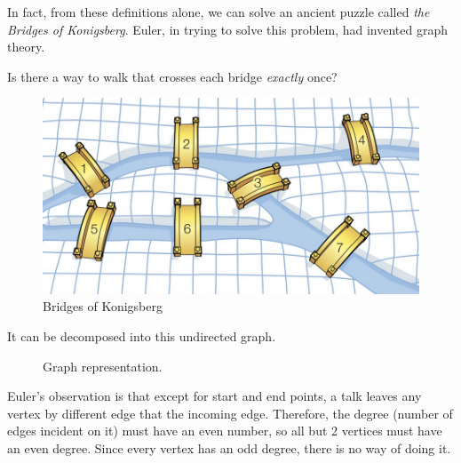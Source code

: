 \documentclass{article}
\begin{document}
    In fact, from these definitions alone, we can solve an ancient puzzle called \textit{the Bridges of Konigsberg}. Euler, in trying to solve this problem, had invented graph theory. 

    \begin{example}
      Is there a way to walk that crosses each bridge \textit{exactly} once? 
      \begin{figure}[H]
        \centering 
        \includegraphics[scale=0.4]{img/bridges.png}
        \caption{Bridges of Konigsberg} 
        \label{fig:bridges}
      \end{figure}
      It can be decomposed into this undirected graph. 
      \begin{figure}[H]
        \centering 
        \caption{Graph representation. } 
        \label{fig:bridge_graph}
      \end{figure}
      Euler's observation is that except for start and end points, a talk leaves any vertex by different edge that the incoming edge. Therefore, the degree (number of edges incident on it) must have an even number, so all but 2 vertices must have an even degree. Since every vertex has an odd degree, there is no way of doing it. 
    \end{example}
\end{document}
